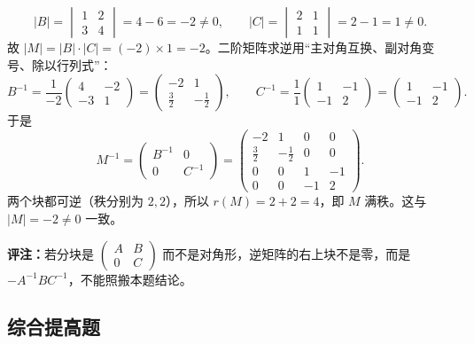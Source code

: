 \[
|B|=\begin{vmatrix}1&2\\3&4\end{vmatrix}=4-6=-2\neq0,\qquad
|C|=\begin{vmatrix}2&1\\1&1\end{vmatrix}=2-1=1\neq0.
\]
故 \(|M|=|B|\cdot|C|=(-2)\times 1=-2\)。二阶矩阵求逆用“主对角互换、副对角变号、除以行列式”：
\[
B^{-1}=\frac{1}{-2}\begin{pmatrix}4&-2\\-3&1\end{pmatrix}
=\begin{pmatrix}-2&1\\[2pt] \frac32&-\frac12\end{pmatrix},
\qquad
C^{-1}=\frac{1}{1}\begin{pmatrix}1&-1\\-1&2\end{pmatrix}
=\begin{pmatrix}1&-1\\-1&2\end{pmatrix}.
\]
于是
\[
M^{-1}=\begin{pmatrix}
B^{-1}&0\\
0&C^{-1}
\end{pmatrix}
=\begin{pmatrix}
-2&1&0&0\\
\frac32&-\frac12&0&0\\
0&0&1&-1\\
0&0&-1&2
\end{pmatrix}.
\]
两个块都可逆（秩分别为 \(2,2\)），所以 \(r(M)=2+2=4\)，即 \(M\) 满秩。这与 \(|M|=-2\neq0\) 一致。

\textbf{评注：}若分块是 \(\begin{pmatrix}A&B\\0&C\end{pmatrix}\) 而不是对角形，逆矩阵的右上块不是零，而是 \(-A^{-1}BC^{-1}\)，不能照搬本题结论。

\else \answerarea[8] \fi%

\subsection{综合提高题}

